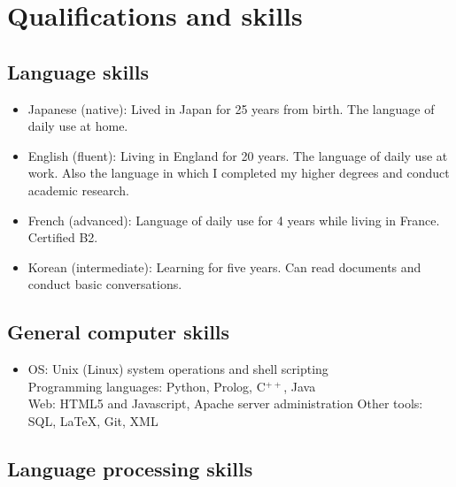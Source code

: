 \documentclass[a4paper]{article}
\begin{document}
\section*{Qualifications and skills}

\subsection*{Language skills}
\begin{itemize}
\item Japanese (native): Lived in Japan for 25 years from birth. The
  language of daily use at home.

\vspace{-1mm}

\item  English (fluent): Living in England for 20 years. The language of
  daily use at work. Also the language in which I completed my higher
  degrees and conduct academic research.

\vspace{-1mm}

\item  French (advanced): Language of daily use for 4 years while living in France. Certified B2.

\vspace{-1mm}

\item  Korean (intermediate): Learning for five years. Can read documents
  and conduct basic conversations.
\end{itemize}

\subsection*{General computer skills}

\begin{itemize}
 \item OS: Unix (Linux) system operations and shell scripting\\
  Programming languages: Python, Prolog, C$^{++}$, Java\\
  Web: HTML5 and Javascript, Apache server administration
   Other tools: SQL, \LaTeX, Git, XML

\end{itemize}

\subsection*{Language processing skills}
\end{document}
